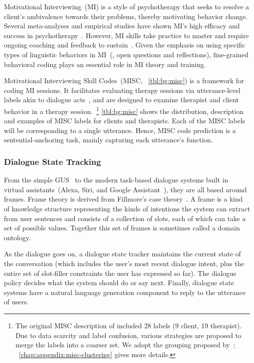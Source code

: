 Motivational Interviewing~(MI) is a style of psychotherapy that seeks
to resolve a client's ambivalence towards their problems, thereby
motivating behavior change. Several meta-analyses and empirical
studies have shown MI's high efficacy and success in
psychotherapy~\citep{burke2004emerging, martins2009review,
  lundahl2010meta}. However, MI skills take practice to master and
require ongoing coaching and feedback to sustain~\citep{Schwalbe2014}.
Given the emphasis on using specific types of linguistic behaviors in
MI~(\eg, open questions and reflections), fine-grained behavioral
coding plays an essential role in MI theory and training.

Motivational Interviewing Skill Codes~(MISC, ~\autoref{tbl:bg:misc})
is a framework for coding MI sessions. It facilitates evaluating
therapy sessions via utterance-level labels akin to dialogue
acts~\citep{stolcke2000dialogue,jurafsky2018speech}, and are designed
to examine therapist and client behavior in a therapy
session.~\footnote{The original MISC description of
  \citet{miller2003manual} included 28 labels (9 client, 19
  therapist). Due to data scarcity and label confusion, various
  strategies are proposed to merge the labels into a coarser set.  We
  adopt the grouping proposed by~\citet{xiao2016behavioral};
  ~\autoref{chap:appendix:misc-clustering} gives more details.}
\autoref{tbl:bg:misc} shows the distribution, description and examples
of MISC labels for clients and therapists. Each of the MISC labels
will be corresponding to a single utterance. Hence, MISC code
prediction is a sentential-anchoring task, mainly capturing each
utterance's function.

\subsubsection{Dialogue State Tracking}
\label{ssec:bg:dialogue-state}
From the simple GUS~\citep{bobrow1977gus} to the modern task-based
dialogue systems built in virtual assistants~(Alexa, Siri, and Google
Assistant~\etal), they are all based around frames. Frame theory is
derived from Fillmore's case theory~\citep{Fillmore:68}. A frame is a
kind of knowledge structure representing the kinds of intentions the
system can extract from user sentences and consists of a collection of
slots, each of which can take a set of possible values. Together this
set of frames is sometimes called a domain ontology.

As the dialogue goes on, a dialogue state tracker maintains the
current state of the conversation (which includes the user's most recent
dialogue intent, plus the entire set of slot-filler constraints the
user has expressed so far). The dialogue policy decides what the
system should do or say next. Finally, dialogue state systems have a
natural language generation component to reply to the utterance of users.

